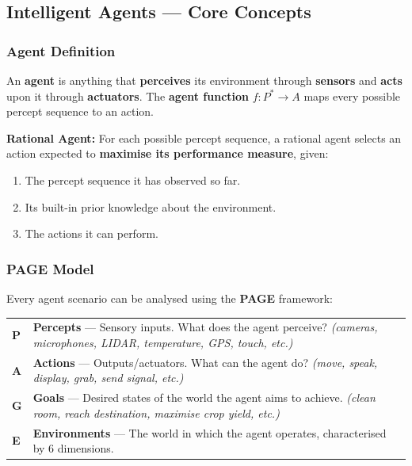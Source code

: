 \documentclass[12pt, a4paper]{article}
\begin{document}
\subsection{Intelligent Agents — Core Concepts}

\subsubsection*{Agent Definition}

\noindent An \textbf{agent} is anything that \textbf{perceives} its environment through \textbf{sensors} and \textbf{acts} upon it through \textbf{actuators}. The \textbf{agent function} $f : P^* \to A$ maps every possible percept sequence to an action.

\vspace{0.3em}
\noindent\textbf{Rational Agent:} For each possible percept sequence, a rational agent selects an action expected to \textbf{maximise its performance measure}, given:
\begin{enumerate}[noitemsep]
  \item The percept sequence it has observed so far.
  \item Its built-in prior knowledge about the environment.
  \item The actions it can perform.
\end{enumerate}

\subsubsection*{PAGE Model}

\noindent Every agent scenario can be analysed using the \textbf{PAGE} framework:

\begin{center}
\renewcommand{\arraystretch}{1.3}
\begin{tabular}{l|p{12cm}}
\toprule
\textbf{P} & \textbf{Percepts} — Sensory inputs. What does the agent perceive? \emph{(cameras, microphones, LIDAR, temperature, GPS, touch, etc.)} \\
\textbf{A} & \textbf{Actions} — Outputs/actuators. What can the agent do? \emph{(move, speak, display, grab, send signal, etc.)} \\
\textbf{G} & \textbf{Goals} — Desired states of the world the agent aims to achieve. \emph{(clean room, reach destination, maximise crop yield, etc.)} \\
\textbf{E} & \textbf{Environments} — The world in which the agent operates, characterised by 6 dimensions. \\
\bottomrule
\end{tabular}
\end{center}
\end{document}
